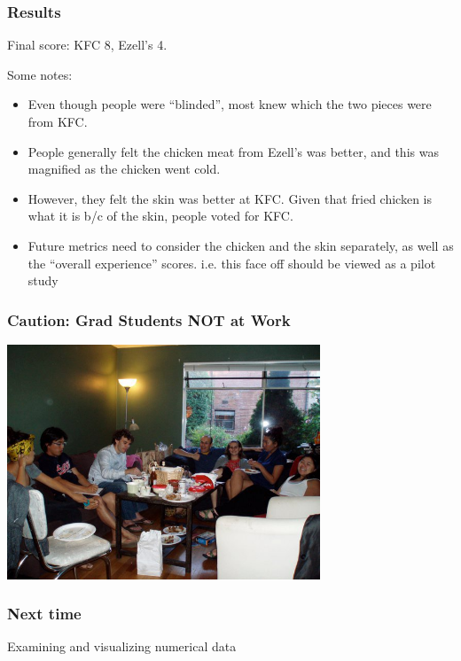\documentclass[slides]{beamer}
\newcommand{\blue}[1]{\textcolor{blue2}{#1}}
\begin{document}
\begin{frame}
\frametitle{Results}
Final score:  KFC 8, Ezell's 4.

Some notes:
\begin{itemize}
\pause\item Even though people were ``blinded'', most knew which the two pieces were from KFC.  
\pause\item People generally felt the chicken meat from Ezell's was better, and this was magnified as the chicken went cold.
\pause\item However, they felt the skin was better at KFC.  Given that fried chicken is what it is b/c of the skin, people voted for KFC.
\pause\item Future metrics need to consider the chicken and the skin separately, as well as the ``overall experience'' scores.  i.e. this face off should be viewed as a \blue{pilot study} 
\end{itemize}

\end{frame}


\begin{frame}
\frametitle{Caution: Grad Students NOT at Work}

\begin{center}
\includegraphics[height=7cm]{figure/fried_chicken}
\end{center}

\end{frame}


\begin{frame}
\frametitle{Next time}
Examining and visualizing numerical data
\end{frame}
\end{document}
